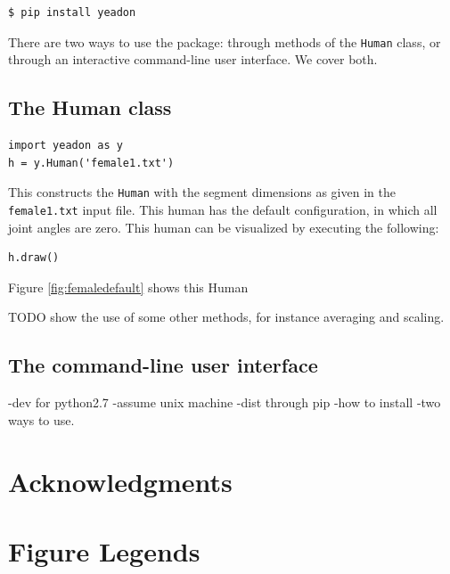 \documentclass[10pt]{article}
\begin{document}
\begin{verbatim}
$ pip install yeadon
\end{verbatim}

There are two ways to use the package: through methods of the \verb+Human+
class, or through an interactive command-line user interface. We cover both.



\subsection*{The Human class}

\begin{verbatim}
import yeadon as y
h = y.Human('female1.txt')
\end{verbatim}

This constructs the \verb+Human+ with the segment dimensions as given in the
\verb+female1.txt+ input file. This human has the default configuration, in
which all joint angles are zero. This human can be visualized by executing the
following:

\begin{verbatim}
h.draw()
\end{verbatim}

Figure \ref{fig:femaledefault} shows this Human

TODO show the use of some other methods, for instance averaging and scaling.

\subsection*{The command-line user interface}


-dev for python2.7
-assume unix machine
-dist through pip
-how to install
-two ways to use.



\section*{Acknowledgments}




\section*{Figure Legends}
\end{document}
